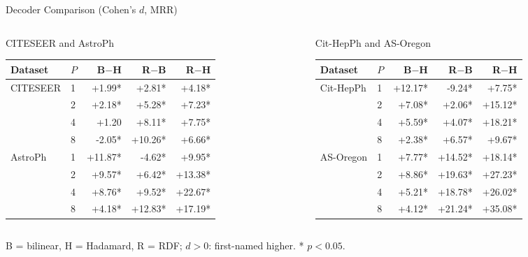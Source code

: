 \documentclass[aspectratio=169]{beamer}
\begin{document}
\begin{frame}{Decoder Comparison (Cohen's $d$, MRR)}
  \scriptsize
  \setlength{\tabcolsep}{3pt}
  \begin{columns}
    \begin{column}{0.48\textwidth}
      \centering CITESEER and AstroPh
      \begin{tabular}{llrrr}
        \toprule
        Dataset & $P$ & B$-$H & R$-$B & R$-$H \\
        \midrule
        CITESEER  & 1 & +1.99* & +2.81* & +4.18* \\
                  & 2 & +2.18* & +5.28* & +7.23* \\
                  & 4 & +1.20  & +8.11* & +7.75* \\
                  & 8 & -2.05* & +10.26* & +6.66* \\
        \midrule
        AstroPh   & 1 & +11.87* & -4.62* & +9.95* \\
                  & 2 & +9.57* & +6.42* & +13.38* \\
                  & 4 & +8.76* & +9.52* & +22.67* \\
                  & 8 & +4.18* & +12.83* & +17.19* \\
        \bottomrule
      \end{tabular}
    \end{column}
    \begin{column}{0.48\textwidth}
      \centering Cit-HepPh and AS-Oregon
      \begin{tabular}{llrrr}
        \toprule
        Dataset & $P$ & B$-$H & R$-$B & R$-$H \\
        \midrule
        Cit-HepPh & 1 & +12.17* & -9.24* & +7.75* \\
                  & 2 & +7.08* & +2.06* & +15.12* \\
                  & 4 & +5.59* & +4.07* & +18.21* \\
                  & 8 & +2.38* & +6.57* & +9.67* \\
        \midrule
        AS-Oregon & 1 & +7.77* & +14.52* & +18.14* \\
                  & 2 & +8.86* & +19.63* & +27.23* \\
                  & 4 & +5.21* & +18.78* & +26.02* \\
                  & 8 & +4.12* & +21.24* & +35.08* \\
        \bottomrule
      \end{tabular}
    \end{column}
  \end{columns}

  \vspace{0.5em}
  \scriptsize B = bilinear, H = Hadamard, R = RDF; $d > 0$: first-named higher. * $p < 0.05$.
\end{frame}
\end{document}
